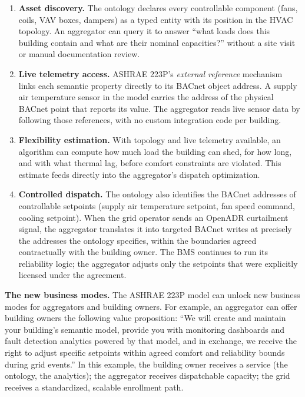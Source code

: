 \begin{enumerate}[leftmargin=*, itemsep=2pt]
  \item \textbf{Asset discovery.} The ontology declares every controllable component (fans, coils,
        VAV boxes, dampers) as a typed entity with its position in the HVAC topology.
        An aggregator can query it to answer ``what loads does this building contain and what are
        their nominal capacities?'' without a site visit or manual documentation review.
  \item \textbf{Live telemetry access.} ASHRAE 223P's \emph{external reference} mechanism links
        each semantic property directly to its BACnet object address.
        A supply air temperature sensor in the model carries the address of the physical BACnet
        point that reports its value.
        The aggregator reads live sensor data by following those references, with no custom
        integration code per building.
  \item \textbf{Flexibility estimation.} With topology and live telemetry available, an 
        algorithm can compute how much load the building can shed, for how long, and with what
        thermal lag, before comfort constraints are violated.
        This estimate feeds directly into the aggregator's dispatch optimization.
  \item \textbf{Controlled dispatch.} The ontology also identifies the BACnet addresses of
        controllable setpoints (supply air temperature setpoint, fan speed command, cooling
        setpoint).
        When the grid operator sends an OpenADR curtailment signal, the aggregator translates it
        into targeted BACnet writes at precisely the addresses the ontology specifies, within
        the boundaries agreed contractually with the building owner.
        The BMS continues to run its reliability logic; the aggregator adjusts only the setpoints
        that were explicitly licensed under the agreement.
\end{enumerate}

\textbf{The new business modes.}
The ASHRAE 223P model can unlock new business modes for aggregators and building owners. For example,
an aggregator can offer building owners the following value proposition: ``We will create and
maintain your building's semantic model, provide you with monitoring dashboards and fault detection
analytics powered by that model, and in exchange, we receive the right to adjust specific setpoints
within agreed comfort and reliability bounds during grid events.'' In this example, 
the building owner receives a service (the ontology, the analytics); the aggregator receives
dispatchable capacity; the grid receives a standardized, scalable enrollment path.